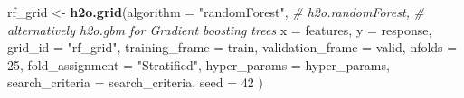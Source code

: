 \documentclass[]{article}
\newenvironment{Shaded}{\begin{snugshade}}{\end{snugshade}}
\newcommand{\KeywordTok}[1]{\textcolor[rgb]{0.13,0.29,0.53}{\textbf{{#1}}}}
\newcommand{\DataTypeTok}[1]{\textcolor[rgb]{0.13,0.29,0.53}{{#1}}}
\newcommand{\DecValTok}[1]{\textcolor[rgb]{0.00,0.00,0.81}{{#1}}}
\newcommand{\StringTok}[1]{\textcolor[rgb]{0.31,0.60,0.02}{{#1}}}
\newcommand{\CommentTok}[1]{\textcolor[rgb]{0.56,0.35,0.01}{\textit{{#1}}}}
\newcommand{\NormalTok}[1]{{#1}}
\begin{document}
\begin{Shaded}
\begin{Highlighting}[]
\NormalTok{rf_grid <-}\StringTok{ }\KeywordTok{h2o.grid}\NormalTok{(}\DataTypeTok{algorithm =} \StringTok{"randomForest"}\NormalTok{, }\CommentTok{# h2o.randomForest, }
                                                \CommentTok{# alternatively h2o.gbm for Gradient boosting trees}
                    \DataTypeTok{x =} \NormalTok{features,}
                    \DataTypeTok{y =} \NormalTok{response,}
                    \DataTypeTok{grid_id =} \StringTok{"rf_grid"}\NormalTok{,}
                    \DataTypeTok{training_frame =} \NormalTok{train,}
                    \DataTypeTok{validation_frame =} \NormalTok{valid,}
                    \DataTypeTok{nfolds =} \DecValTok{25}\NormalTok{,                           }
                    \DataTypeTok{fold_assignment =} \StringTok{"Stratified"}\NormalTok{,}
                    \DataTypeTok{hyper_params =} \NormalTok{hyper_params,}
                    \DataTypeTok{search_criteria =} \NormalTok{search_criteria,}
                    \DataTypeTok{seed =} \DecValTok{42}
                    \NormalTok{)}
\end{Highlighting}
\end{Shaded}
\end{document}
